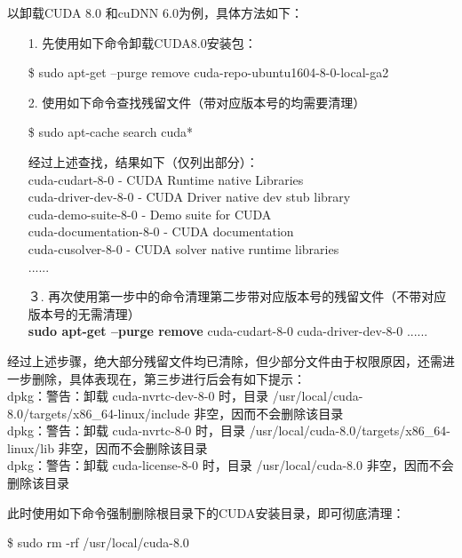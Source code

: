 \documentclass[11pt,a4paper]{ctexart}
\begin{document}
以卸载CUDA 8.0 和cuDNN 6.0为例，具体方法如下：
\begin{itemize}
\item[1.] 先使用如下命令卸载CUDA8.0安装包：
\vspace{-0.3cm}
\begin{center}
\$ sudo apt-get --purge remove cuda-repo-ubuntu1604-8-0-local-ga2\\
\end{center}

\item[2.] 使用如下命令查找残留文件（带对应版本号的均需要清理） 
\vspace{-0.3cm}
\begin{center}
\$ sudo apt-cache search cuda*
\end{center}
经过上述查找，结果如下（仅列出部分）：\\
cuda-cudart-8-0 - CUDA Runtime native Libraries\\
cuda-driver-dev-8-0 - CUDA Driver native dev stub library\\
cuda-demo-suite-8-0 - Demo suite for CUDA\\
cuda-documentation-8-0 - CUDA documentation\\
cuda-cusolver-8-0 - CUDA solver native runtime libraries\\
......
\item[３.] 再次使用第一步中的命令清理第二步带对应版本号的残留文件（不带对应版本号的无需清理） \\
{\textbf {sudo apt-get --purge remove}} cuda-cudart-8-0 cuda-driver-dev-8-0 ......
\end{itemize}

经过上述步骤，绝大部分残留文件均已清除，但少部分文件由于权限原因，还需进一步删除，具体表现在，第三步进行后会有如下提示：\\
dpkg：警告：卸载 cuda-nvrtc-dev-8-0 时，目录 /usr/local/cuda-8.0/targets/x86\_64-linux/include 非空，因而不会删除该目录\\
dpkg：警告：卸载 cuda-nvrtc-8-0 时，目录 /usr/local/cuda-8.0/targets/x86\_64-linux/lib 非空，因而不会删除该目录\\
dpkg：警告：卸载 cuda-license-8-0 时，目录 /usr/local/cuda-8.0 非空，因而不会删除该目录

此时使用如下命令强制删除根目录下的CUDA安装目录，即可彻底清理：
\vspace{-0.3cm}
\begin{center}
\$ sudo rm -rf /usr/local/cuda-8.0
\end{center}
\end{document}
